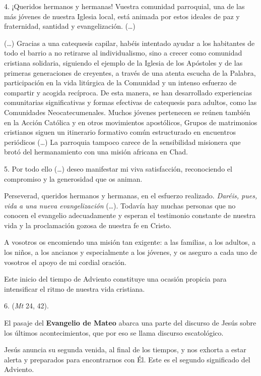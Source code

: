 \begin{body}
\begin{body}
		4. ¡Queridos hermanos y hermanas! Vuestra comunidad parroquial, una de las más jóvenes de nuestra Iglesia local, está animada por estos ideales de paz y fraternidad, santidad y evangelización. (\ldots{})

		(\ldots{}) Gracias a una catequesis capilar, habéis intentado ayudar a los habitantes de todo el barrio a no retirarse al individualismo, sino a crecer como comunidad cristiana solidaria, siguiendo el ejemplo de la Iglesia de los Apóstoles y de las primeras generaciones de creyentes, a través de una atenta escucha de la Palabra, participación en la vida litúrgica de la Comunidad y un intenso esfuerzo de compartir y acogida recíproca. De esta manera, se han desarrollado experiencias comunitarias significativas y formas efectivas de catequesis para adultos, como las Comunidades Neocatecumenales. Muchos jóvenes pertenecen se reúnen también en la Acción Católica y en otros movimientos apostólicos, Grupos de matrimonios cristianos siguen un itinerario formativo común estructurado en encuentros periódicos (\ldots{}) La parroquia tampoco carece de la sensibilidad misionera que brotó del hermanamiento con una misión africana en Chad.

		5. Por todo ello (\ldots{}) deseo manifestar mi viva satisfacción, reconociendo el compromiso y la generosidad que os animan.

		Perseverad, queridos hermanos y hermanas, en el esfuerzo realizado. \emph{Daréis, pues, vida a una nueva evangelización} (\ldots{}). Todavía hay muchas personas que no conocen el evangelio adecuadamente y esperan el testimonio constante de nuestra vida y la proclamación gozosa de nuestra fe en Cristo.

		A vosotros os encomiendo una misión tan exigente: a las familias, a los adultos, a los niños, a los ancianos y especialmente a los jóvenes, y os aseguro a cada uno de vosotros el apoyo de mi cordial oración.

		Este inicio del tiempo de Adviento constituye una ocasión propicia para intensificar el ritmo de nuestra vida cristiana.

		6.  (\emph{Mt} 24, 42).

		El pasaje del \textbf{Evangelio de Mateo} abarca una parte del discurso de Jesús sobre los últimos acontecimientos, que por eso se llama discurso escatológico.

		Jesús anuncia su segunda venida, al final de los tiempos, y nos exhorta a estar alerta y preparados para encontrarnos con Él. Este es el segundo significado del Adviento.


\end{body}
\end{body}
